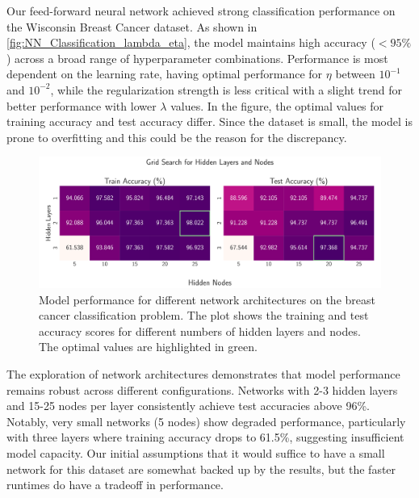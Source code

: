 Our feed-forward neural network achieved strong classification performance on the Wisconsin Breast Cancer dataset. As shown in \cref{fig:NN_Classification_lambda_eta}, the model maintains high accuracy ($<95\%$) across a broad range of hyperparameter combinations. Performance is most dependent on the learning rate, having optimal performance for $\eta$ between $10^{-1}$ and $10^{-2}$, while the regularization strength is less critical with a slight trend for better performance with lower $\lambda$ values. In the figure, the optimal values for training accuracy and test accuracy differ. Since the dataset is small, the model is prone to overfitting and this could be the reason for the discrepancy.

\onecolumngrid
\begin{figure}[ht!]
    \centering
    \includegraphics[width = .9\textwidth]{../figs/classification_hidden_layers_nodes.pdf}
    \caption{Model performance for different network architectures on the breast cancer classification problem. The plot shows the training and test accuracy scores for different numbers of hidden layers and nodes. The optimal values are highlighted in green.}
    \label{fig:NN_Classification_hidden_layers_nodes}
\end{figure}
\twocolumngrid

The exploration of network architectures demonstrates that model performance remains robust across different configurations. Networks with 2-3 hidden layers and 15-25 nodes per layer consistently achieve test accuracies above 96\%. Notably, very small networks (5 nodes) show degraded performance, particularly with three layers where training accuracy drops to 61.5\%, suggesting insufficient model capacity. Our initial assumptions that it would suffice to have a small network for this dataset are somewhat backed up by the results, but the faster runtimes do have a tradeoff in performance.


